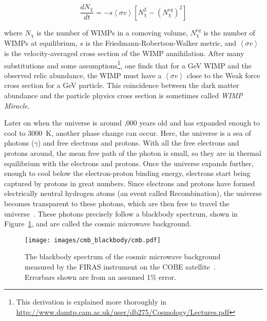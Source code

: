     \begin{equation}\label{eqn:boltz_dm}
      \frac{dN_\chi}{dt} = -s \left \langle \sigma v \right \rangle \left [ N_\chi^2 - \left ( N_\chi^{eq} \right )^2 \right ]
    \end{equation}
    
    where $N_\chi$ is the number of WIMPs in a comoving volume, $N_\chi^{eq}$ is the number of WIMPs at equilibrium, $s$ is the Friedmann-Robertson-Walker metric, and $\left \langle \sigma v \right \rangle$ is the velocity-averaged cross section of the WIMP annihilation.
    After many substitutions and some assumptions\footnote{This derivation is explained more thoroughly in \url{http://www.damtp.cam.ac.uk/user/db275/Cosmology/Lectures.pdf}}, one finds that for a \nicetilde{}GeV WIMP and the observed relic abundance, the WIMP must have a $\left \langle \sigma v \right \rangle$ close to the Weak force cross section for a \nicetilde{}GeV particle.
    This coincidence between the dark matter abundance and the particle physics cross section is sometimes called \textit{WIMP Miracle}.
    
    
    Later on when the universe is around ,000 years old and has expanded enough to cool to \nicetilde\SI{3000}{K}, another phase change can occur.
    Here, the universe is a sea of photons ($\gamma$) and free electrons and protons.
    With all the free electrons and protons around, the mean free path of the photon is small, so they are in thermal equilibrium with the electrons and protons.
    Once the universe expands further, enough to cool below the electron-proton binding energy, electrons start being captured by protons in great numbers.
    Since electrons and protons have formed electrically neutral hydrogen atoms (an event called Recombination), the universe becomes transparent to these photons, which are then free to travel the universe~\cite{planck2015,theEarlyUniverse,CMBFundamentals,CMBFlat}.
    These photons precisely follow a blackbody spectrum, shown in Figure~\ref{fig:cmb_black}, and are called the cosmic microwave background.
    
    \begin{figure}[ht]
      \centering
      \texttt{[image: images/cmb\_blackbody/cmb.pdf]}
      \caption[Cosmic Microwave Background Blackbody]{
        The blackbody spectrum of the cosmic microwave background measured by the FIRAS instrument on the COBE satellite~\cite{mather1990}.
        Errorbars shown are from an assumed 1\% error.
      }
      \label{fig:cmb_black}
    \end{figure}
    
